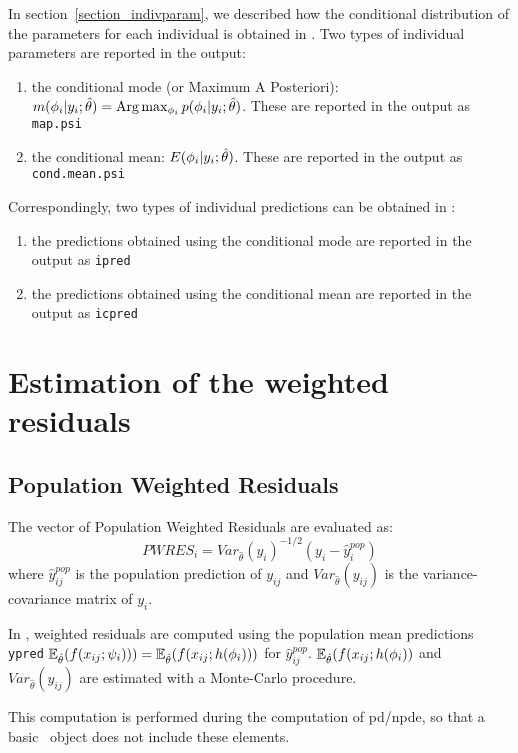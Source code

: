In section~\ref{section_indivparam}, we described how the conditional distribution of the parameters for each individual is obtained in \monolix. Two types of individual parameters are reported in the output:
\begin{enumerate}
\item the conditional mode (or Maximum A Posteriori): $ m({{\phi}_i}|y_i;\hat{\theta})={\rm Arg}\max_{{\phi}_i} p({{\phi}_i}|y_i;\hat{\theta})$. These are reported in the output as \texttt{map.psi}
\item the conditional mean: $ E({{\phi}_i}|y_i;\hat{\theta})$. These are reported in the output as \texttt{cond.mean.psi}
\end{enumerate}
Correspondingly, two types of individual predictions can be obtained in \monolix:
\begin{enumerate}
\item the predictions obtained using the conditional mode are reported in the output as \texttt{ipred}
\item the predictions obtained using the conditional mean are reported in the output as \texttt{icpred}
\end{enumerate}

\section{Estimation of the weighted residuals} \label{section_wres}

\subsection{Population Weighted Residuals}
The vector of Population Weighted Residuals are evaluated as:
$$PWRES_{i} = Var_{\hat{\theta}}(y_{i})^{-1/2} \left( y_{i} - \hat{y}^{pop}_{i} \right)$$
where $\hat{y}^{pop}_{ij}$ is the population prediction of $y_{ij}$ and $Var_{\hat{\theta}}(y_{ij})$ is the variance-covariance matrix of $y_{i}$.

In \monolix, weighted residuals are computed using the population mean predictions \texttt{ypred} $\mathbb{E}_{\hat{\theta}}(f(x_{ij} ; {\psi_i}) ))=\mathbb{E}_{\hat{\theta}}(f(x_{ij} ; h({{\phi}_i}) ))$ for $\hat{y}^{pop}_{ij}$. $\mathbb{E}_{\hat{\theta}}(f(x_{ij} ; h({{\phi}_i})  )$ and $Var_{\hat{\theta}}(y_{ij})$ are estimated with a Monte-Carlo procedure.

 This computation is performed during the computation of pd/npde, so that a basic \monolix~object does not include these elements.

